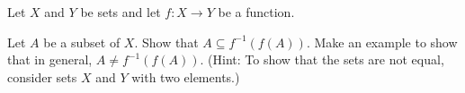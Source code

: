 \begin{comment}

\ExerciseSolution Assume $A$ and $B$ are finite sets with $n$ and $m$ elements, respectively. First we prove that if $f : A \to B$ is a bijection, then $n = m$. So assume there is a bijection $f: A \to B$. We proceed by contradiction and assume that $n \neq m$. Let $B = \{b_1, b_2, \ldots, b_m\}$. Since $n \neq m$, there are two cases to consider.
\begin{description}
\item[Case 1: $n>m$] Since $f$ is a surjection, for each $i$ between $1$ and $m$ there exists $a_i \in A$ such that $f(a_i) = b_i$. If $a_i = a_j$ for some $i$ and $j$, then $b_i = f(a_i) = f(a_j) = b_j$, which implies that $i=j$. So the  $a_i$ are all distinct. Now $\{a_1, a_2, \ldots, a_m\} \subseteq A$, and $|A| = n >m$, so there is an element $a_{m+1} \in A$ with $a_{m+1} \neq a_i$ for $1 \leq i \leq m$. Thus, $f(a_{m+1}) \in B$ means that $f(a_{m+1}) = b_j$ for some $1 \leq j \leq m$. But then $f(a_{m+1}) = f(a_j)$. Since $f$ is an injection, this implies that $a_{m+1} = a_j$, a contradiction. We conclude that $n$ is not larger than $m$.  
\item[Case 2: $m>n$] Again, since $f$ is a surjection, for each $i$ between $1$ and $m$ there exists $a_i \in A$ such that $f(a_i) = b_i$. As in Case 1, the $a_i$ are all distinct. But then $\{a_1, a_2, \ldots, a_m\} \subseteq A$, and $|A| \geq m > n$, which is a contradiction. Thus, $m$ cannot exceed $n$.  
\end{description}
We are left, therefore, with the conclusion that $n=m$.

Now we prove that if $n = m$, then there is a bijection $f: A \to B$. So assume $n = m$. Let $A = \{a_1, a_2, \ldots, a_n\}$ and $B = \{b_1, b_2, \ldots, b_n\}$. Define $f : A \to B$ by $f(a_i) = b_i$ for $1 \leq i \leq n$.  We will show that $f$ is a bijection. First we prove that $f$ is an injection. Suppose $f(a_i) = f(a_j)$ for some $1 \leq i, j \leq n$. Then $b_i = b_j$ which implies $i=j$. Thus, $f$ is an injection. By definition, $f$ is a surjection. Therefore, $f$ is a bijection. 

\end{comment}

\item Let $X$ and $Y$ be sets and let $f: X \to Y$ be a function.
\ba
\item  Let $A$ be a subset of $X$. Show that $A \subseteq f^{-1}(f(A))$. Make an example to show that in general, $A \neq f^{-1}(f(A))$. (Hint: To show that the sets are not equal, consider sets $X$ and $Y$ with two elements.) 

